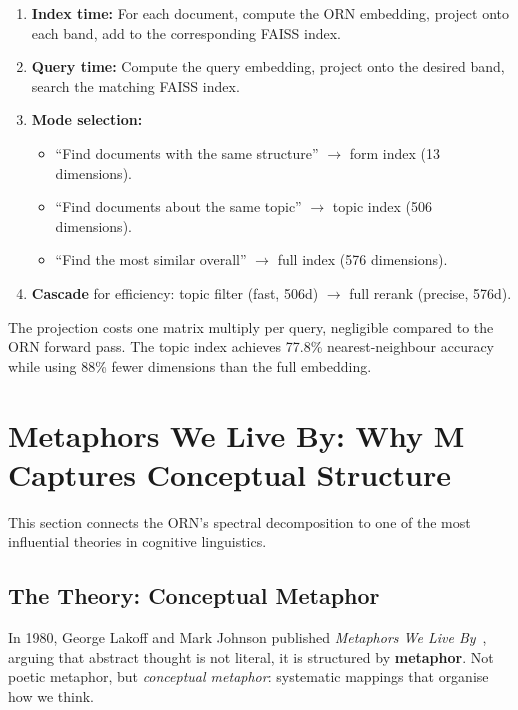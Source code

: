 \documentclass[11pt, a4paper]{article}
\newcommand{\M}{\mathbf{M}}
\theoremstyle{remark}
\begin{document}
\begin{enumerate}[nosep]
    \item \textbf{Index time:} For each document, compute the ORN embedding, project onto each band, add to the corresponding FAISS index.
    \item \textbf{Query time:} Compute the query embedding, project onto the desired band, search the matching FAISS index.
    \item \textbf{Mode selection:}
    \begin{itemize}[nosep]
        \item ``Find documents with the same structure'' $\to$ form index (13 dimensions).
        \item ``Find documents about the same topic'' $\to$ topic index (506 dimensions).
        \item ``Find the most similar overall'' $\to$ full index (576 dimensions).
    \end{itemize}
    \item \textbf{Cascade} for efficiency: topic filter (fast, 506d) $\to$ full rerank (precise, 576d).
\end{enumerate}

The projection costs one matrix multiply per query, negligible compared to the ORN forward pass.
The topic index achieves 77.8\% nearest-neighbour accuracy while using 88\% fewer dimensions than the full embedding.

\section{Metaphors We Live By: Why \texorpdfstring{$\M$}{M} Captures Conceptual Structure}
\label{sec:metaphors}

This section connects the ORN's spectral decomposition to one of the most influential theories in cognitive linguistics.

\subsection{The Theory: Conceptual Metaphor}

In 1980, George Lakoff and Mark Johnson published \emph{Metaphors We Live By}~\cite{lakoff1980}, arguing that abstract thought is not literal, it is structured by \textbf{metaphor}.
Not poetic metaphor, but \emph{conceptual metaphor}: systematic mappings that organise how we think.
\end{document}
